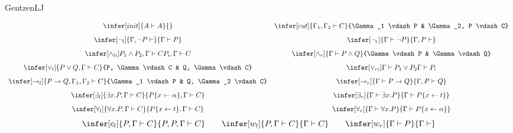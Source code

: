 \begin{entry}{GentzenLJ}  



\begin{calculus}

\[
\begin{array}{cc}
\infer[init]{A \vdash A}{}
&
\infer[cut]{\Gamma_1, \Gamma_2 \vdash C}{\Gamma_1 \vdash P & \Gamma_2, P \vdash C}
\\[8pt]
\infer[\neg_l]{\Gamma, \neg P \vdash }{\Gamma \vdash P}
&
\infer[\neg_r]{\Gamma \vdash \neg P}{\Gamma, P \vdash }
\\[8pt]
\infer[\wedge_{li}]{P_1 \wedge P_2, \Gamma \vdash C}{P_i, \Gamma \vdash C}
&
\infer[\wedge_r]{\Gamma \vdash P \wedge Q}{\Gamma \vdash P & \Gamma \vdash Q}
\\[8pt]
\infer[\vee_l]{P \vee Q, \Gamma \vdash C}{P, \Gamma \vdash C & Q, \Gamma \vdash C}
&
\infer[\vee_{ri}]{\Gamma \vdash P_1 \vee P_2}{\Gamma \vdash P_i}
\\[8pt]
\infer[\rightarrow_l]{P \rightarrow Q, \Gamma_1, \Gamma_2 \vdash C}{\Gamma_1
\vdash P & Q, \Gamma_2 \vdash C}
&
\infer[\rightarrow_r]{\Gamma \vdash P \rightarrow Q}{\Gamma, P \vdash Q}
\\[8pt]
\infer[\exists_l]{\exists x.P, \Gamma \vdash C}{P\{x \leftarrow
\alpha\}, \Gamma \vdash C}
&
\infer[\exists_r]{\Gamma \vdash \exists x.P}{\Gamma \vdash P\{x
\leftarrow t\}}
\\[8pt]
\infer[\forall_l]{\forall x.P, \Gamma \vdash C}{P\{x \leftarrow t\}, \Gamma \vdash C}
&
\infer[\forall_r]{\Gamma \vdash \forall x.P}{\Gamma \vdash P\{x
\leftarrow \alpha \}}
\\
\end{array}
\]
$$
\infer[c_l]{P, \Gamma \vdash C}{P, P, \Gamma \vdash C}
\qquad
\infer[w_l]{P, \Gamma \vdash C}{\Gamma \vdash C}
\qquad
\infer[w_r]{\Gamma \vdash P}{\Gamma \vdash}
$$

\end{calculus}



\end{entry}
